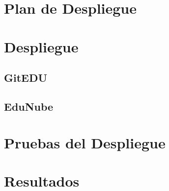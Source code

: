 %
%
%

\section{Plan de Despliegue}

\section{Despliegue}

\subsection{GitEDU}

\subsection{EduNube}

\section{Pruebas del Despliegue}

\section{Resultados}

